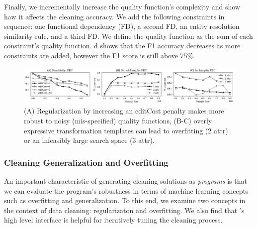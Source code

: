 
 Finally, we incrementally increase the quality function's complexity and show haw it affects the cleaning accuracy.  We add the following constraints in sequence: one functional dependency (FD), a second FD, an entity resolution similarity rule, and a third FD.  We define the quality function as the sum of each constraint's quality function.   d shows that the F1 accuracy decreases as more constraints are added, however the F1 score is still above $75\%$.  


 \begin{figure}[ht]
\centering
 \includegraphics[width=\textwidth]{exp/exp5.png}
 \caption{\small (A) Regularization by increasing an editCost penalty makes \sys more robust to noisy (mis-specified) quality functions, (B-C) overly expressive transformation templates can lead to overfitting (2 attr) or an infeasibly large search space (3 attr).  
 \label{fig:sensitivity}}
\end{figure}

\subsubsection{Cleaning Generalization and Overfitting}\label{s:expoverfit}
An important characteristic of generating cleaning solutions as {\it programs} is that we can evaluate the program's robustness in terms of machine learning concepts such as overfitting and generalization.    To this end, we examine two concepts in the context of data cleaning: regularizaton and overfitting.  We also find that \sys's high level interface is helpful for iteratively tuning the cleaning process.

